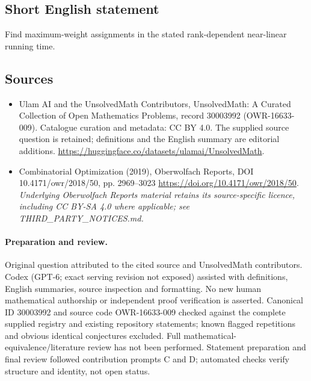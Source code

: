 \documentclass[11pt]{article}
\begin{document}
\subsection{Short English statement}
Find maximum-weight assignments in the stated rank-dependent near-linear running time.
\subsection{Sources}
\begin{itemize}
\item[\hypertarget{source:30003992:1}{S1}] Ulam AI and the UnsolvedMath Contributors, UnsolvedMath: A Curated Collection of Open Mathematics Problems, record 30003992 (OWR-16633-009). Catalogue curation and metadata: CC BY 4.0. The supplied source question is retained; definitions and the English summary are editorial additions.
\url{https://huggingface.co/datasets/ulamai/UnsolvedMath}.
\item[\hypertarget{source:30003992:2}{S2}] Combinatorial Optimization (2019), Oberwolfach Reports, DOI 10.4171/owr/2018/50, pp. 2969--3023
\url{https://doi.org/10.4171/owr/2018/50}.
\textit{Underlying Oberwolfach Reports material retains its source-specific licence, including CC BY-SA 4.0 where applicable; see THIRD\_PARTY\_NOTICES.md.}
\end{itemize}
\paragraph{Preparation and review.}
Original question attributed to the cited source and UnsolvedMath contributors. Codex (GPT-6; exact serving revision not exposed) assisted with definitions, English summaries, source inspection and formatting. No new human mathematical authorship or independent proof verification is asserted. Canonical ID 30003992 and source code OWR-16633-009 checked against the complete supplied registry and existing repository statements; known flagged repetitions and obvious identical conjectures excluded. Full mathematical-equivalence/literature review has not been performed. Statement preparation and final review followed contribution prompts C and D; automated checks verify structure and identity, not open status.
\label{end:30003992}
\end{document}
